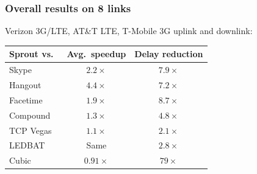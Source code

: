 \documentclass[svgnames]{beamer}
\begin{document}
\begin{frame}
{T-Mobile3GUMTS-Downlink.pdf_tex}}\only<12>{\def\svgwidth{\columnwidth}\footnotesize{T-Mobile3GUMTS-Uplink.pdf_tex}}
\end{frame}

\begin{frame}
\frametitle{Overall results on 8 links}

Verizon 3G/LTE, AT\&T LTE, T-Mobile 3G uplink and downlink:

\vspace{\baselineskip}

\begin{tabular}{|l|c|c|}
\hline
{\color{blue}Sprout} vs.~ & Avg.~speedup & Delay reduction \\
\hline
\hline
{\color{red}Skype} & $2.2\times$ & $7.9\times$ \\
{\color{red}Hangout} & $4.4\times$ & $7.2\times$ \\
{\color{red}Facetime} & $1.9\times$ & $8.7\times$ \\
\hline
{\color{ForestGreen}Compound} & $1.3\times$ & $4.8\times$ \\
{\color{ForestGreen}TCP Vegas} & $1.1\times$ & $2.1\times$ \\
{\color{ForestGreen}LEDBAT} & Same & $2.8\times$ \\
{\color{Orange}Cubic} & \cellcolor{red!20} $0.91\times$ & $79\times$ \\
\hline
\end{tabular}

\end{frame}

\end{document}
